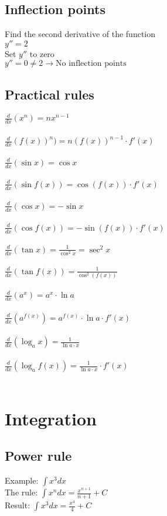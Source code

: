 \documentclass[a4paper, 10pt]{article}
\begin{document}
\subsection{Inflection points}
Find the second derivative of the function\\
$y'' = 2$\\
Set $y''$ to zero\\
$y'' = 0 \neq 2 \rightarrow \text{No inflection points}$

\subsection{Practical rules}
$\frac{d}{dx} (x^n)= nx^{n-1}$\\\\
$\frac{d}{dx} (f(x))^n) = n(f(x))^{n-1} \cdot f'(x)$\\\\
$\frac{d}{dx} (\sin x) = \cos x $\\\\
$\frac{d}{dx} (\sin f(x)) = \cos(f(x)) \cdot f'(x) $\\\\
$\frac{d}{dx} (\cos x) = -\sin x $\\\\
$\frac{d}{dx} (\cos f(x)) = -\sin(f(x)) \cdot f'(x) $\\\\
$\frac{d}{dx} (\tan x) = \frac{1}{\cos^2x} = \sec^2 x$\\\\
$\frac{d}{dx} (\tan f(x)) = \frac{1}{\cos^2(f(x))}$\\\\
$\frac{d}{dx} (a^x) = a^x \cdot \ln a$\\\\
$\frac{d}{dx} (a^{f(x)}) = a^{f(x)} \cdot \ln a \cdot f'(x)$\\\\
$\frac{d}{dx} (\log_ax) = \frac{1}{\ln a \cdot x} $\\\\
$\frac{d}{dx} (\log_af(x)) = \frac{1}{\ln a \cdot x} \cdot f'(x) $\\\\


\section{Integration}

\subsection{Power rule}
Example: $\int x^3 dx$\\
The rule: $\int x^n dx = \frac{x^{n+1}}{n+1} + C$\\
Result: $\int x^3 dx = \frac{x^4}{4} + C$
\end{document}
